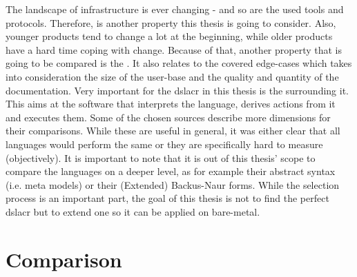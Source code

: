 The landscape of infrastructure is ever changing - and so are the used tools and protocols. Therefore,  is another property this thesis is going to consider.
\newline
Also, younger products tend to change a lot at the beginning, while older products have a hard time coping with change. Because of that, another property that is going to be compared is the . It also relates to the covered edge-cases which takes into consideration the size of the user-base and the quality and quantity of the documentation.
\newline
Very important for the \gls{dslacr} in this thesis is the  surrounding it. This aims at the software that interprets the language, derives actions from it and executes them.
\newline
Some of the chosen sources describe more dimensions for their comparisons. While these are useful in general, it was either clear that all languages would perform the same or they are specifically hard to measure (objectively). %
\newline
It is important to note that it is out of this thesis' scope to compare the languages on a deeper level, as for example their abstract syntax (i.e. meta models) or their (Extended) Backus-Naur forms. While the selection process is an important part, the goal of this thesis is not to find the perfect \gls{dslacr} but to extend one so it can be applied on bare-metal.



\section{Comparison} %

